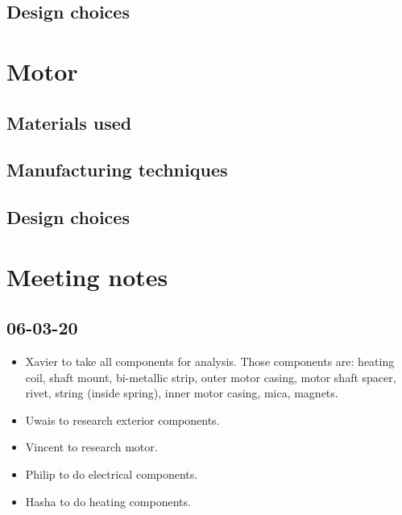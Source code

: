 \documentclass[12pt,a4paper, twoside]{report}
\begin{document}
\section{Design choices}
\chapter{Motor}
\section{Materials used}
\section{Manufacturing techniques}
\section{Design choices}
\chapter{Meeting notes}
\section{06-03-20}
\begin{itemize}
  \item Xavier to take all components for analysis. Those components are: heating coil, shaft mount, bi-metallic strip, outer motor casing, motor shaft spacer, rivet, string (inside spring), inner motor casing, mica, magnets.
  \item Uwais to research exterior components. 
  \item Vincent to research motor.
  \item Philip to do electrical components.
  \item Hasha to do heating components.
\end{itemize}
\end{document}
